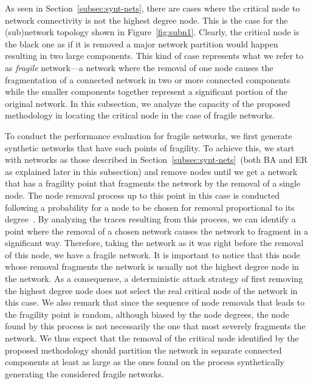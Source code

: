 \documentclass[conference,fleqn]{IEEEtran}
\begin{document}
As seen in Section~\ref{subsec:synt-nets}, there are cases where the critical node to
network connectivity is not the highest degree node. This is the case for
the (sub)network topology shown in Figure~\ref{fig:subn1}. Clearly, the critical node is the black one 
as if it is removed a major network partition would happen resulting in two large components. This kind of case represents what
we refer to as \emph{fragile} network---a network where the removal of one node causes the fragmentation of a connected network
in two or more connected components while the smaller components together represent a significant portion of the original network.
In this subsection, we analyze the capacity of the proposed methodology in locating the critical node in the
case of fragile networks.







To conduct the performance evaluation for fragile networks, 
we first generate synthetic networks that have such points of fragility. To achieve this, we start with
networks as those described in Section~\ref{subsec:synt-nets}~(both BA and ER as explained later in this subsection)
and remove nodes until we get a network that has a fragility point that fragments the network by the removal
of a single node. The node removal process up to this point in this case is conducted following a
probability for a node to be chosen for removal proportional to its degree~\cite{Wehmuth2010}.
By analyzing the traces resulting from this process, we can identify a point where the removal of a chosen 
network causes the network to fragment in a significant way. Therefore, taking the network as it was right before the removal of this node, we have
a fragile network. It is important to notice that this node whose removal fragments the network is usually not the highest degree node in the network.
As a consequence, a deterministic attack strategy of first removing the highest degree node does not select the real critical node of the network in this case.
We also remark that since the sequence of node removals that leads to the fragility point is random, although biased by the node degrees, the node found by this process is not 
necessarily the one that most severely fragments the network.
We thus expect that the removal of the critical node identified by the proposed methodology 
should partition the network in separate connected components at least as large as the ones found on the process
synthetically generating the considered fragile networks.
\end{document}
